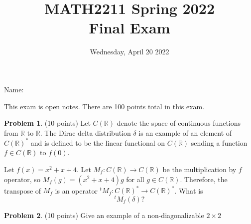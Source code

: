 \documentclass[11pt,oneside]{amsart}
\title{MATH2211 Spring 2022\\
Final Exam}
\author{Wednesday, April 20 2022}
\theoremstyle{definition}
\newtheorem{problem}{Problem}
\newcommand{\bR}{\mathbb{R}}
\begin{document}
    \maketitle

    Name: \underline{\hspace{6cm}}

    This exam is open notes. There are 100 points total in this exam.

    \begin{problem}
        (10 points) Let $C(\bR)$ denote the space of continuous functions from $\bR$ to $\bR$. The Dirac delta distribution $\delta$ is an example of an element of $C(\bR)^*$ and is defined to be the linear functional on $C(\bR)$ sending a function $f\in C(\bR)$ to $f(0)$.

        Let $f(x)=x^2+x+4$. Let $M_f\colon C(\bR)\to C(\bR)$ be the multiplication by $f$ operator, so $M_f(g)=(x^2+x+4)g$ for all $g\in C(\bR)$. Therefore, the transpose of $M_f$ is an operator $^tM_f\colon C(\bR)^*\to C(\bR)^*$. What is
        \[^t M_f(\delta)?\]
    \end{problem}

    \begin{problem}
        (10 points) Give an example of a non-diagonalizable $2\times 2$ 
    \end{problem}
    \vfill
\end{document}
